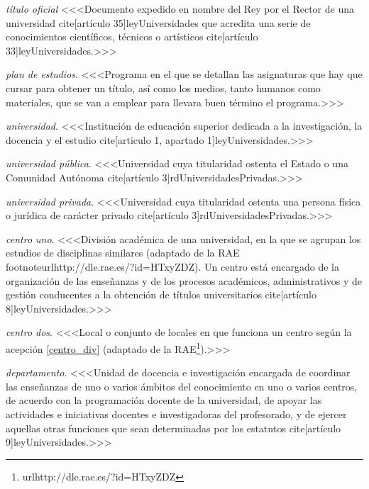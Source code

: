     \item \emph{título oficial} <<<Documento expedido en nombre del Rey por el Rector de una universidad cite[artículo 35]{leyUniversidades} que acredita una serie de conocimientos científicos, técnicos o artísticos cite[artículo 33]{leyUniversidades}.>>>

    \item \emph{plan de estudios}. <<<Programa en el que se detallan las asignaturas que hay que cursar para obtener un título, así como los medios, tanto humanos como materiales, que se van a emplear para llevara buen término el programa.>>>

    \item \emph{universidad}. <<<Institución de educación superior dedicada a la investigación, la docencia y el estudio cite[articulo 1, apartado 1]{leyUniversidades}.>>>

    \item \emph{universidad pública}. <<<Universidad cuya titularidad ostenta el Estado o una Comunidad Autónoma cite[artículo 3]{rdUniversidadesPrivadas}.>>>

    \item \emph{universidad privada}. <<<Universidad cuya titularidad ostenta una persona física o jurídica de carácter privado cite[artículo 3]{rdUniversidadesPrivadas}.>>>

    \item \emph{centro uno}. <<<División académica de una universidad, en la que se agrupan los estudios de disciplinas similares (adaptado de la RAE footnote{url{http://dle.rae.es/?id=HTxyZDZ}}). Un centro está encargado de la organización de las enseñanzas y de los procesos académicos, administrativos y de gestión conducentes a la obtención de títulos universitarios cite[artículo 8]{leyUniversidades}.>>>

     \item \emph{centro dos}. <<<Local o conjunto de locales en que funciona un centro según la acepción \ref{centro_div} (adaptado de la RAE\footnote{url{http://dle.rae.es/?id=HTxyZDZ}}).>>>

    \item \emph{departamento}. <<<Unidad de docencia e investigación encargada de coordinar las enseñanzas de uno o varios ámbitos del conocimiento en uno o varios centros, de acuerdo con la programación docente de la universidad, de apoyar las actividades e iniciativas docentes e investigadoras del profesorado, y de ejercer aquellas otras funciones que sean determinadas por los estatutos cite[artículo 9]{leyUniversidades}.>>>

